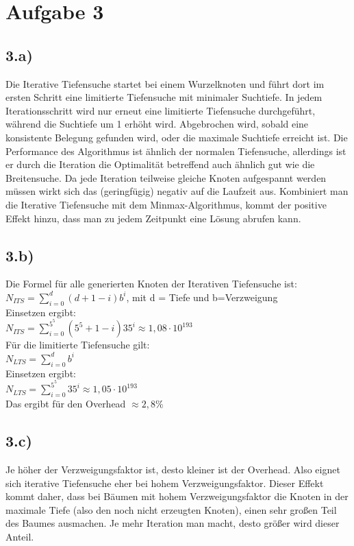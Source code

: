 \documentclass[a4paper]{article}
\begin{document}
\section*{Aufgabe 3}
\subsection*{3.a)}
Die Iterative Tiefensuche startet bei einem Wurzelknoten und führt dort im ersten Schritt eine limitierte Tiefensuche mit minimaler Suchtiefe. In jedem Iterationsschritt wird nur erneut eine limitierte Tiefensuche durchgeführt, während die Suchtiefe um 1 erhöht wird. Abgebrochen wird, sobald eine konsistente Belegung gefunden wird, oder die maximale Suchtiefe erreicht ist. Die Performance des Algorithmus ist ähnlich der normalen Tiefensuche, allerdings ist er durch die Iteration die Optimalität betreffend auch ähnlich gut wie die Breitensuche.
Da jede Iteration teilweise gleiche Knoten aufgespannt werden müssen wirkt sich das (geringfügig) negativ auf die Laufzeit aus. Kombiniert man die Iterative Tiefensuche mit dem Minmax-Algorithmus, kommt der positive Effekt hinzu, dass man zu jedem Zeitpunkt eine Lösung abrufen kann.

\subsection*{3.b)}
Die Formel für alle generierten Knoten der Iterativen Tiefensuche ist:\\
$N_{ITS}=\sum\limits_{i=0}^{d} (d+1-i)b^i$, mit d = Tiefe und b=Verzweigung\\
Einsetzen ergibt:\\
$N_{ITS}=\sum\limits_{i=0}^{5^5} (5^5+1-i)35^i \approx 1,08 \cdot 10^{193}$\\

Für die limitierte Tiefensuche gilt:\\
$N_{LTS}=\sum\limits_{i=0}^{d} b^i$\\
Einsetzen ergibt:\\
$N_{LTS}=\sum\limits_{i=0}^{5^5} 35^i \approx 1,05 \cdot 10^{193}$\\

Das ergibt für den Overhead $\approx 2,8\%$

\subsection*{3.c)}
Je höher der Verzweigungsfaktor ist, desto kleiner ist der Overhead. Also eignet sich iterative Tiefensuche eher bei hohem Verzweigungsfaktor. Dieser Effekt kommt daher, dass bei Bäumen mit hohem Verzweigungsfaktor die Knoten in der maximale Tiefe (also den noch nicht erzeugten Knoten), einen sehr großen Teil des Baumes ausmachen. Je mehr Iteration man macht, desto größer wird dieser Anteil.
\end{document}
